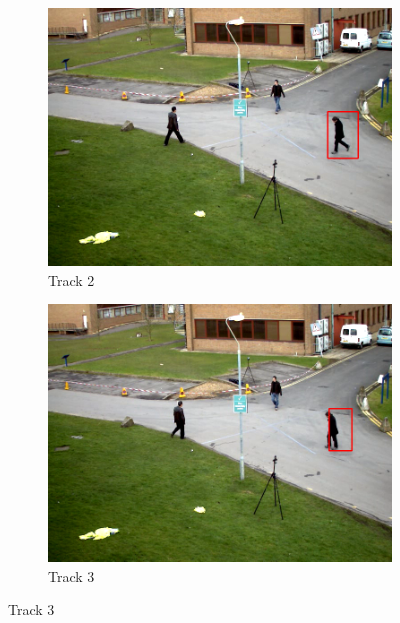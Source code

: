 \documentclass[a4paper,11]{article}
\begin{document}
\begin{figure}[H]
  \begin{subfigure}{0.5\textwidth}
   \centering
   \includegraphics[width=0.8\linewidth]{track2.png}
   \caption{Track 2}
   \end{subfigure}
   \begin{subfigure}{0.5\textwidth}
    \centering
    \includegraphics[width=0.8\linewidth]{track3.png}
    \caption{Track 3}
   \end{subfigure} 
   \end{figure}
    
\end{document}
